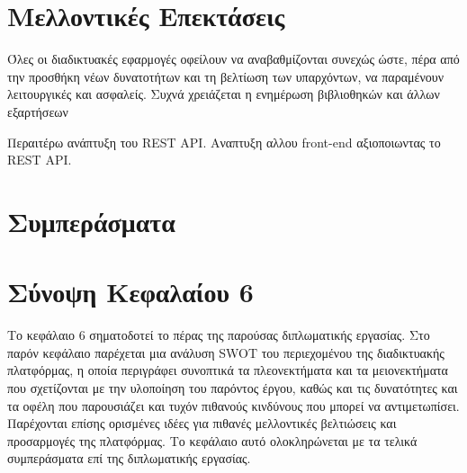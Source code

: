\section{Μελλοντικές Επεκτάσεις}
Όλες οι διαδικτυακές εφαρμογές οφείλουν να αναβαθμίζονται συνεχώς ώστε, πέρα από την προσθήκη νέων δυνατοτήτων και τη βελτίωση των υπαρχόντων, να παραμένουν λειτουργικές και ασφαλείς. Συχνά χρειάζεται η ενημέρωση βιβλιοθηκών και άλλων εξαρτήσεων 

Περαιτέρω ανάπτυξη του REST API.
Αναπτυξη αλλου front-end αξιοποιωντας το REST API.

\section{Συμπεράσματα}


\section{Σύνοψη Κεφαλαίου 6}
Το κεφάλαιο 6 σηματοδοτεί το πέρας της παρούσας διπλωματικής εργασίας. Στο παρόν κεφάλαιο παρέχεται μια ανάλυση SWOT του περιεχομένου της διαδικτυακής πλατφόρμας, η οποία περιγράφει συνοπτικά τα πλεονεκτήματα και τα μειονεκτήματα που σχετίζονται με την υλοποίηση του παρόντος έργου, καθώς και τις δυνατότητες και τα οφέλη που παρουσιάζει και τυχόν πιθανούς κινδύνους που μπορεί να αντιμετωπίσει. Παρέχονται επίσης ορισμένες ιδέες για πιθανές μελλοντικές βελτιώσεις και προσαρμογές της πλατφόρμας. Το κεφάλαιο αυτό ολοκληρώνεται με τα τελικά συμπεράσματα επί της διπλωματικής εργασίας.
